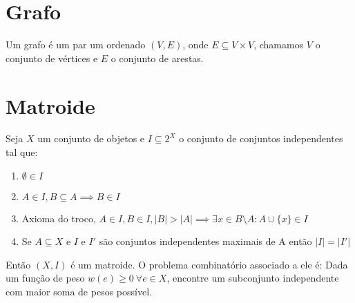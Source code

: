 \section{Grafo}
Um grafo é um par um ordenado $(V, E)$, onde $E \subseteq V\times V$, chamamos $V$ o conjunto de vértices e $E$ o conjunto de arestas.

\section{Matroide}
Seja $X$ um conjunto de objetos e $I \subseteq 2^X$ o conjunto de conjuntos independentes tal que:
\begin{enumerate}
\item $\emptyset \in I$
\item $A \in I, B \subseteq A \implies B \in I$
\item Axioma do troco, $A \in I, B \in I, |B| > |A| \implies \exists x \in B \setminus A : A \cup \{x\} \in I$
\item Se $A \subseteq X$ e $I$ e $I'$ são conjuntos independentes maximais de A então $|I| = |I'|$
\end{enumerate}
Então $(X, I)$ é um matroide. O problema combinatório associado a ele é: Dada um função de peso $w(e) \geq 0 ~\forall e \in X$, encontre um subconjunto independente com maior soma de pesos possível.
